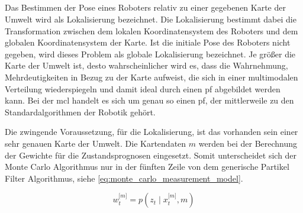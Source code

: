 %
%
\subsection{}

Das Bestimmen der Pose eines Roboters relativ zu einer gegebenen Karte der Umwelt wird als Lokalisierung bezeichnet. Die Lokalisierung bestimmt dabei die Transformation zwischen dem lokalen Koordinatensystem des Roboters und dem globalen Koordinatensystem der Karte. Ist die initiale Pose des Roboters nicht gegeben, wird dieses Problem als globale Lokalisierung bezeichnet. Je größer die Karte der Umwelt ist, desto wahrscheinlicher wird es, dass die Wahrnehmung, Mehrdeutigkeiten in Bezug zu der Karte aufweist, die sich in einer multimodalen Verteilung wiederspiegeln und damit ideal durch einen \Gls{pf} abgebildet werden kann. Bei der \Gls{mcl} handelt es sich um genau so einen \Gls{pf}, der mittlerweile zu den Standardalgorithmen der Robotik gehört.

Die zwingende Voraussetzung, für die Lokalisierung, ist das vorhanden sein einer sehr genauen Karte der Umwelt. Die Kartendaten $m$ werden bei der Berechnung der Gewichte für die Zustandsprognosen eingesetzt. Somit unterscheidet sich der Monte Carlo Algorithmus nur in der fünften Zeile von dem generische Partikel Filter Algorithmus, siehe \autoref{eq:monte_carlo_measurement_model}. 

\begin{equation}
w^{\lbrack m \rbrack}_t = p(z_t \mid x^{\lbrack m \rbrack}_t, m) \label{eq:monte_carlo_measurement_model}
\end{equation}

